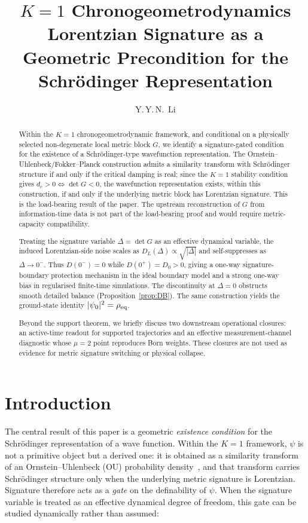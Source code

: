 \documentclass[11pt,a4paper]{article}
\title{\textbf{$K=1$ Chronogeometrodynamics}\\[4pt]
\large Lorentzian Signature as a Geometric Precondition for the Schr\"odinger Representation}
\author{Y.\,Y.\,N.\ Li}
\date{}
\theoremstyle{definition}
\begin{document}
\maketitle

\begin{abstract}
Within the $K{=}1$ chronogeometrodynamic framework, and conditional on a
physically selected non-degenerate local metric block $G$, we identify a
signature-gated condition for the existence of a Schr\"odinger-type
wavefunction representation. The Ornstein--Uhlenbeck/Fokker--Planck
construction admits a similarity transform with Schr\"odinger structure
if and only if the critical damping is real; since the $K{=}1$ stability
condition gives $d_c>0 \Leftrightarrow \det G<0$, the wavefunction
representation exists, within this construction, if and only if the
underlying metric block has Lorentzian signature. This is the
load-bearing result of the paper. The upstream reconstruction of $G$ from
information-time data is not part of the load-bearing proof and would
require metric-capacity compatibility.

Treating the signature variable $\Delta=\det G$ as an effective
dynamical variable, the induced Lorentzian-side noise scales as
$D_L(\Delta)\propto\sqrt{|\Delta|}$ and self-suppresses as
$\Delta\to0^-$. Thus $D(0^-)=0$ while $D(0^+)=D_0>0$, giving a one-way
signature-boundary protection mechanism in the ideal boundary model and a
strong one-way bias in regularised finite-time simulations. The
discontinuity at $\Delta=0$ obstructs smooth detailed balance (Proposition~\ref{prop:DB}). The same
construction yields the ground-state identity $|\psi_0|^2=\rho_{\rm eq}$.

Beyond the support theorem, we briefly discuss two downstream operational
closures: an active-time readout for supported trajectories and an
effective measurement-channel diagnostic whose $\mu=2$ point reproduces
Born weights. These closures are not used as evidence for metric
signature switching or physical collapse.
\end{abstract}

\section{Introduction}\label{sec:intro}

The central result of this paper is a geometric \emph{existence condition} for the Schr\"odinger representation of a wave function. Within the $K{=}1$ framework, $\psi$ is not a primitive object but a derived one: it is obtained as a similarity transform of an Ornstein--Uhlenbeck (OU) probability density~\cite{Nelson,Risken}, and that transform carries Schr\"odinger structure only when the underlying metric signature is Lorentzian. Signature therefore acts as a \emph{gate} on the definability of $\psi$.
When the signature variable is treated as an effective dynamical degree
of freedom, this gate can be studied dynamically rather than assumed:
\end{document}
